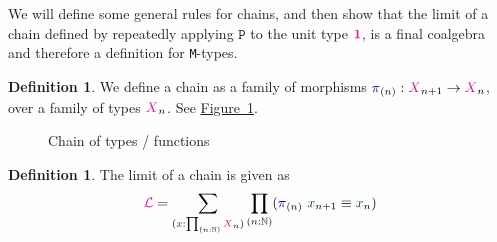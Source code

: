 \documentclass[twoside,11pt,openright]{report}
\theoremstyle{plain} %
\theoremstyle{definition}
\newtheorem{defn}[thm]{Definition}%
\theoremstyle{remark}
\newcommand*{\figref}[1]{\hyperref[fig:#1]{Figure~\ref*{fig:#1}}}
\newcommand*{\term}[1]{\textcolor{green!30!black}{#1}} %
\newcommand*{\type}[1]{\textcolor{magenta!90!black}{#1}}
\newcommand*{\unit}{\type{\textbf{1}}}
\newcommand*{\function}[1]{\textcolor{blue!60!black}{\ensuremath{\mathtt{#1}}}}
\newcommand*{\functor}[1]{\ensuremath{\mathbf{\mathtt{#1}}}}
\begin{document}
\noindent We will define some general rules for chains, and then show that the limit of a chain defined by repeatedly applying \(\functor{P}\) to the unit type \(\unit\), is a final coalgebra and therefore a definition for \texttt{M}-types.
\begin{defn}
  We define a chain as a family of morphisms \(\function{\pi}_{(n)} : \type{X}_{n+1} \rightarrow \type{X}_{n}\), over a family of types \(\type{X}_{n}\). See \figref{x-chain}.
  \begin{figure}[h]
    \centering
    \caption{Chain of types / functions}
    \label{fig:x-chain}
  \end{figure}
\end{defn}
\begin{defn}
  The limit of a chain is given as
  \begin{equation}
    \type{\mathcal{L}} = \sum_{(\term{x} : \prod_{(n : \mathbb{N})} \type{X}_n)} \prod_{(n : \mathbb{N})} (\function{\pi}_{(n)}~\term{x}_{n+1} \equiv \term{x}_n)
  \end{equation}
\end{defn}
\end{document}
